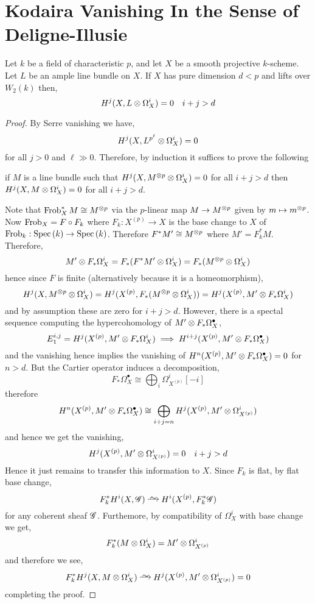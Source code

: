 \documentclass[12pt]{article}
\begin{document}
\section{Kodaira Vanishing In the Sense of Deligne-Illusie}

\begin{theorem}
Let $k$ be a field of characteristic $p$, and let $X$ be a smooth projective $k$-scheme. Let $L$ be an ample line bundle on $X$. If $X$ has pure dimension $d < p$ and lifts over $W_2(k)$ then,
\[ H^j(X, L \otimes \Omega_X^i) = 0 \quad i + j > d \]
\end{theorem}

\begin{proof}
By Serre vanishing we have,
\[ H^j(X, L^{p^\ell} \otimes \Omega_X^i) = 0 \]
for all $j > 0$ and $\ell \gg 0$. Therefore, by induction it suffices to prove the following
\begin{center}
if $M$ is a line bundle such that $H^j(X, M^{\otimes p} \otimes \Omega^i_X) = 0$ for all $i + j > d$ then $H^j(X, M \otimes \Omega_X^i) = 0$ for all $i + j > d$.
\end{center}
Note that $\operatorname{\mathrm{Frob}}_X^* M \cong M^{\otimes p}$ via the $p$-linear map $M \to M^{\otimes p}$ given by $m \mapsto m^{\otimes p}$. Now $\operatorname{\mathrm{Frob}}_X = F \circ F_k$ where $F_k : X^{(p)} \to X$ is the base change to $X$ of $\operatorname{\mathrm{Frob}}_k : \mathrm{Spec}\left( k \right) \to \mathrm{Spec}\left( k \right)$. Therefore $F^* M' \cong M^{\otimes p}$ where $M' = F_k^* M$. Therefore,
\[ M' \otimes F_* \Omega_X^i = F_* (F^* M' \otimes \Omega^i_X) = F_* (M^{\otimes p} \otimes \Omega^i_X) \]
hence since $F$ is finite (alternatively because it is a homeomorphism),
\[ H^j(X, M^{\otimes p} \otimes \Omega^i_X) = H^j(X^{(p)}, F_* (M^{\otimes p} \otimes \Omega^i_X)) = H^j(X^{(p)}, M' \otimes F_* \Omega_X^i) \]
and by assumption these are zero for $i + j > d$. However, there is a spectal sequence computing the hypercohomology of $M' \otimes F_* \Omega^\bullet_X$,
\[ E_1^{i,j} = H^j(X^{(p)}, M' \otimes F_* \Omega_X^i) \implies H^{i+j}(X^{(p)}, M' \otimes F_* \Omega_X^\bullet) \]
and the vanishing hence implies the vanishing of $H^n(X^{(p)}, M' \otimes F_* \Omega^\bullet_X) = 0$ for $n > d$. But the Cartier operator induces a decomposition,
\[ F_* \Omega_X^\bullet \cong \bigoplus_i \Omega_{X^{(p)}}^i[-i] \]
therefore
\[ H^{n}(X^{(p)}, M' \otimes F_* \Omega_X^\bullet) \cong \bigoplus_{i + j = n} H^j(X^{(p)}, M' \otimes \Omega_{X^{(p)}}^i) \]
and hence we get the vanishing,
\[ H^j(X^{(p)}, M' \otimes \Omega_{X^{(p)}}^i) = 0 \quad i + j > d \]
Hence it just remains to transfer this information to $X$. Since $F_k$ is flat, by flat base change, 
\[ F^*_k H^i(X, \G) \iso H^i(X^{(p)}, F_k^* \G) \]  
for any coherent sheaf $\mathscr{G}$. Furthemore, by compatibility of $\Omega_X^i$ with base change we get,
\[ F_k^* (M \otimes \Omega_X^i) = M' \otimes \Omega_{X^{(p)}}^i \]
and therefore we see,
\[ F_k^* H^j(X, M \ot \Omega_X^i) \iso H^j(X^{(p)}, M' \ot \Omega_{X^{(p)}}^i) = 0 \]
completing the proof.
\end{proof}
\end{document}
